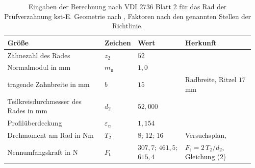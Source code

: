 
\begin{table}[htbp]
	\caption{Eingaben der Berechnung nach VDI 2736 Blatt 2 für das Rad der Prüfverzahnung kst-E. Geometrie nach , Faktoren nach den genannten Stellen der Richtlinie.}
	\label{tab:vdi2736_eingaben}
	\centering
	\footnotesize
	\setlength{\tabcolsep}{4pt}
	\begin{tabular}{L{4.6cm}L{1.6cm}L{3.6cm}L{4.9cm}}
		Größe                                  & Zeichen                   & Wert                            & Herkunft                                                                              \\
		\hline
		Zähnezahl des Rades                    & $z_{\mathrm{2}}$          & $52$                            &                                                            \\
		\hline
		Normalmodul in mm                      & $m_{\mathrm{n}}$          & $1{,}0$                         &                                                            \\
		\hline
		tragende Zahnbreite in mm              & $b$                       & $15$                            & Radbreite, Ritzel $17$\,mm                                                            \\
		\hline
		Teilkreisdurchmesser des Rades in mm   & $d_{\mathrm{2}}$          & $52{,}000$                      &                                                            \\
		\hline
		Profilüberdeckung                      & $\varepsilon_{\alpha}$    & $1{,}154$                       &                                                            \\
		\hline
		Drehmoment am Rad in Nm                & $T_{\mathrm{2}}$          & $8$; $12$; $16$                 & Versuchsplan,                                                  \\
		\hline
		Nennumfangskraft in N                  & $F_{\mathrm{t}}$          & $307{,}7$; $461{,}5$; $615{,}4$ & $F_{\mathrm{t}} = 2\,T_{\mathrm{2}}/d_{\mathrm{2}}$, Gleichung (2) \cite{VDI2736-2}   \\

\end{tabular}
\end{table}
